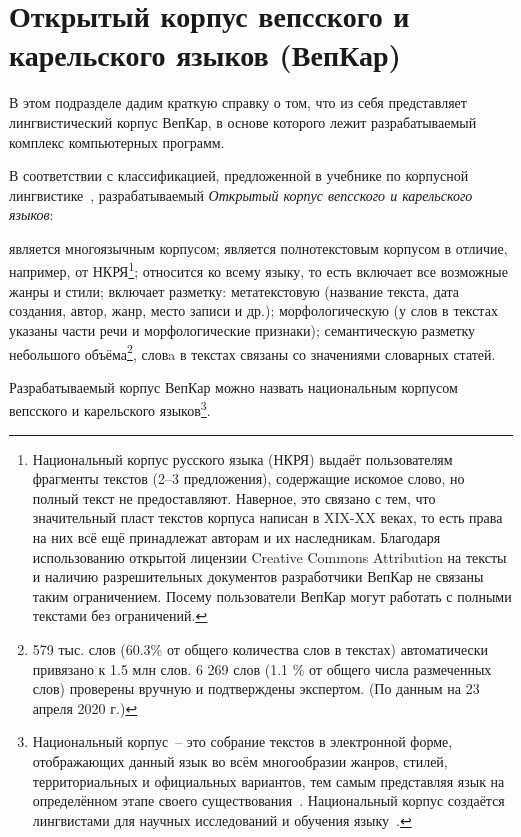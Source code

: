 
\section{Открытый корпус вепсского и карельского языков (ВепКар)} \label{sect_VepKar_about}

В этом подразделе дадим краткую справку о том, что из себя представляет 
лингвистический корпус ВепКар, в основе которого лежит 
разрабатываемый комплекс компьютерных программ.

В соответствии с классификацией, предложенной 
в учебнике по корпусной лингвистике~\cite[с.~12]{Zakharov2005}, 
разрабатываемый \emph{Открытый корпус вепсского и карельского языков}: 
\renewcommand{\outlinei}{itemize}
\renewcommand{\outlineii}{itemize}
\begin{outline}
    \1 является многоязычным корпусом;
    \1 является полнотекстовым корпусом в отличие, например, от НКРЯ\footnote{
        Национальный корпус русского языка (НКРЯ)  
        выдаёт пользователям фрагменты текстов (2--3 предложения), 
        содержащие искомое слово, но полный текст не предоставляют. 
        Наверное, это связано с тем, что значительный пласт текстов корпуса написан в XIX-XX веках, 
        то есть права на них всё ещё принадлежат авторам и их наследникам. 
        Благодаря использованию открытой лицензии Creative Commons Attribution на тексты 
        и наличию разрешительных документов разработчики ВепКар не связаны таким ограничением. 
        Посему пользователи ВепКар могут работать с полными текстами без ограничений.
    };
    \1 относится ко всему языку, то есть включает все возможные жанры и стили;
    \1 включает разметку:
        \2[\textbullet] метатекстовую (название текста, дата создания, автор, жанр, место записи и др.);
        \2[\textbullet] морфологическую (у слов в текстах указаны части речи и морфологические признаки);
        \2[\textbullet] семантическую разметку небольшого объёма\footnote{ 579 тыс. слов (60.3\% от общего количества слов в
         	             текстах) автоматически привязано к 1.5 млн  слов. 6 269 слов (1.1 \% от общего числа размеченных слов) 
         	             проверены вручную и подтверждены экспертом.
                        (По данным на 23 апреля 2020 г.)}, словa в текстах связаны со значениями словарных статей.
\end{outline}

Разрабатываемый корпус ВепКар можно назвать национальным корпусом 
вепсского и карельского языков\footnote{ Национальный корпус~-- это собрание текстов 
в электронной форме, 
отображающих данный язык во всём многообразии жанров, стилей, территориальных и официальных вариантов, 
тем самым представляя язык на определённом этапе своего существования~\cite[с.~418]{Kibrik2019}. 
Национальный корпус создаётся лингвистами для научных исследований и обучения языку~\cite[с.~419]{Kibrik2019}.
}.

